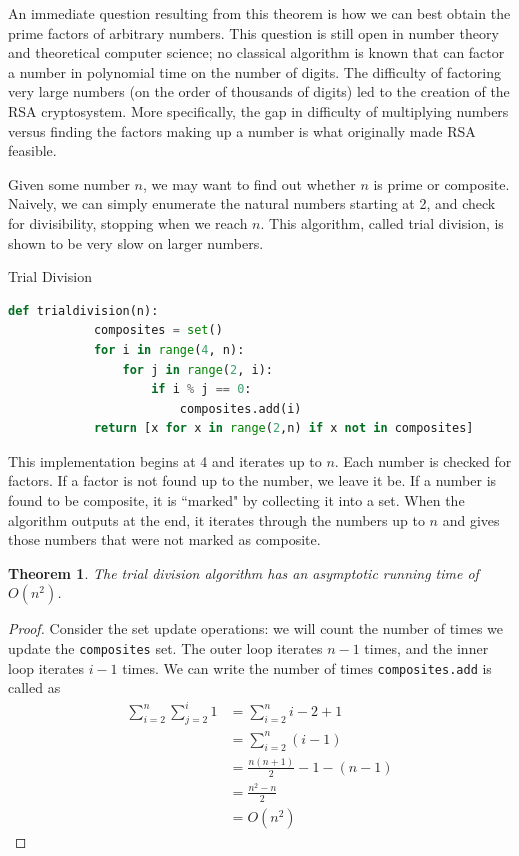 \documentclass{amsart}
\newtheorem{thm}{Theorem}
\theoremstyle{definition}
\theoremstyle{case}
\begin{document}
	An immediate question resulting from this theorem is how we can best obtain the prime factors of arbitrary numbers. This question is still open in number theory and theoretical computer science; no classical algorithm is known that can factor a number in polynomial time on the number of digits. The difficulty of factoring very large numbers (on the order of thousands of digits) led to the creation of the RSA cryptosystem. More specifically, the gap in difficulty of multiplying numbers versus finding the factors making up a number is what originally made RSA feasible.
	
	Given some number $n$, we may want to find out whether $n$ is prime or composite. Naively, we can simply enumerate the natural numbers starting at 2, and check for divisibility, stopping when we reach $n$. This algorithm, called trial division, is shown to be very slow on larger numbers.
	
	\begin{Algorithm}[H]\caption{Trial Division}
		\begin{lstlisting}[language=Python]
        def trialdivision(n):
            composites = set()
            for i in range(4, n):
                for j in range(2, i):
                    if i % j == 0:
                        composites.add(i)
            return [x for x in range(2,n) if x not in composites]
		\end{lstlisting}
	\end{Algorithm}
	
	This implementation begins at 4 and iterates up to $n$. Each number is checked for factors. If a factor is not found up to the number, we leave it be. If a number is found to be composite, it is ``marked" by collecting it into a set. When the algorithm outputs at the end, it iterates through the numbers up to $n$ and gives those numbers that were not marked as composite.
	
	\begin{thm}
		The trial division algorithm has an asymptotic running time of $O(n^2)$.
	\end{thm}
	\begin{proof}
		Consider the set update operations: we will count the number of times we update the \texttt{composites} set. The outer loop iterates $n-1$ times, and the inner loop iterates $i-1$ times. We can write the number of times \texttt{composites.add} is called as
		\begin{equation*}
		\begin{split}
		\sum_{i=2}^{n} \sum_{j=2}^{i} 1 & = \sum_{i=2}^{n} i-2+1 \\
		& = \sum_{i=2}^{n} (i-1) \\
		& = \frac{n(n+1)}{2} - 1 - (n-1) \\
		& = \frac{n^2 - n}{2} \\
		& = O(n^2)
		\end{split}
		\end{equation*}
	\end{proof}
	
\end{document}
